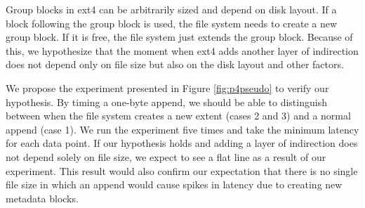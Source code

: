 Group blocks in ext4 can be arbitrarily sized and depend on disk layout. If a block following the group block is used, the file system needs to create a new group block. If it is free, the file system just extends the group block. Because of this, we hypothesize that the moment when ext4 adds another layer of indirection does not depend only on file size but also on the disk layout and other factors.

We propose the experiment presented in Figure \ref{fig:p4pseudo} to verify our hypothesis. By timing a one-byte append, we should be able to distinguish between when the file system creates a new extent (cases 2 and 3) and a normal append (case 1). We run the experiment five times and take the minimum latency for each data point. If our hypothesis holds and adding a layer of indirection does not depend solely on file size, we expect to see a flat line as a result of our experiment. This result would also confirm our expectation that there is no single file size in which an append would cause spikes in latency due to creating new metadata blocks.

